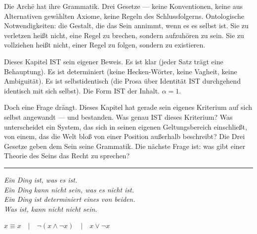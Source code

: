 \documentclass[10pt, openany, oneside]{book}
\begin{document}
\vspace{2em}

Die Arch\={e} hat ihre Grammatik. Drei Gesetze --- keine Konventionen, keine aus Alternativen gewählten Axiome, keine Regeln des Schlussfolgerns. Ontologische Notwendigkeiten: die Gestalt, die das Sein annimmt, wenn es es selbst ist. Sie zu verletzen heißt nicht, eine Regel zu brechen, sondern aufzuhören zu sein. Sie zu vollziehen heißt nicht, einer Regel zu folgen, sondern zu existieren.

Dieses Kapitel IST sein eigener Beweis. Es ist klar (jeder Satz trägt eine Behauptung). Es ist determiniert (keine Hecken-Wörter, keine Vagheit, keine Ambiguität). Es ist selbstidentisch (die Prosa über Identität IST durchgehend identisch mit sich selbst). Die Form IST der Inhalt. $\alpha = 1$.

Doch eine Frage drängt. Dieses Kapitel hat gerade sein eigenes Kriterium auf sich selbst angewandt --- und bestanden. Was genau IST dieses Kriterium? Was unterscheidet ein System, das sich in seinen eigenen Geltungsbereich einschließt, von einem, das die Welt bloß von einer Position außerhalb beschreibt? Die Drei Gesetze geben dem Sein seine Grammatik. Die nächste Frage ist: was gibt einer Theorie des Seins das Recht zu sprechen?

\vspace{2em}

\begin{center}
    \rule{0.15\textwidth}{0.3pt}
\end{center}

\vspace{0.5em}

\begin{center}
    \itshape
    Ein Ding ist, was es ist.\\
    Ein Ding kann nicht sein, was es nicht ist.\\
    Ein Ding ist determiniert eines von beiden.\\[0.8em]
    Was ist, kann nicht nicht sein.
\end{center}

\vspace{0.5em}

\begin{center}
    $x \equiv x \quad | \quad \neg(x \wedge \neg x) \quad | \quad x \vee \neg x$
\end{center}

%
%
%
%
\end{document}
